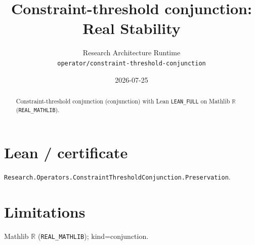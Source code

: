 \documentclass[11pt]{article}
\title{Constraint-threshold conjunction: Real Stability}
\author{Research Architecture Runtime \\ \texttt{operator/constraint-threshold-conjunction}}
\date{2026-07-25}
\begin{document}
\maketitle
\begin{abstract}
Constraint-threshold conjunction (conjunction) with Lean \texttt{LEAN\_FULL} on Mathlib $\mathbb{R}$ (\texttt{REAL\_MATHLIB}).
\end{abstract}
\section{Lean / certificate}
\texttt{Research.Operators.ConstraintThresholdConjunction.Preservation}.
\section{Limitations}
Mathlib $\mathbb{R}$ (\texttt{REAL\_MATHLIB}); kind=conjunction.
\end{document}
